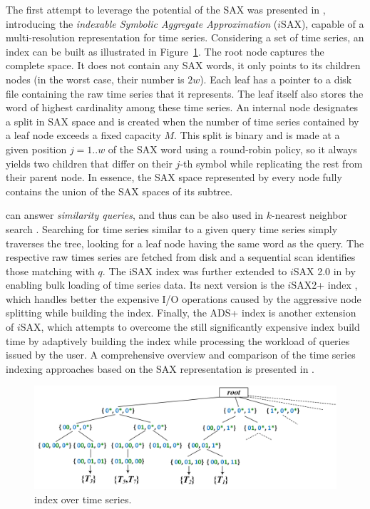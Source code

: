 The first attempt to leverage the potential of the SAX was presented in \cite{shieh2008kdd}, introducing the \textit{indexable Symbolic Aggregate Approximation} ($i$SAX), capable of a multi-resolution representation for time series. Considering a set of time series, an \isax index \cite{shieh2008kdd} can be built as illustrated in Figure~\ref{fig:isaxtree}. The root node captures the complete \isax space. It does not contain any SAX words, it only points to its children nodes (in the worst case, their number is $2w$). Each leaf has a pointer to a disk file containing the raw time series that it represents. The leaf itself also stores the \isax word of highest cardinality among these time series. An internal node designates a split in SAX space and is created when the number of time series contained by a leaf node exceeds a fixed capacity $M$. This split is binary and is made at a given position $j=1..w$ of the SAX word using a round-robin policy, so it always yields two children that differ on their $j$-th symbol while replicating the rest from their parent node. In essence, the SAX space represented by every node fully contains the union of the SAX spaces of its subtree.

\isax can answer {\em similarity queries}, and thus can be also used in $k$-nearest neighbor search \cite{shieh2008kdd}. Searching for time series similar to a given query time series simply traverses the \isax tree, looking for a leaf node having the same \isax word as the query. The respective raw times series are fetched from disk and a sequential scan identifies those matching with $q$. The iSAX index was further extended to $i$SAX 2.0 in \cite{camerra2010icdm} by enabling bulk loading of time series data. Its next version is the $i$SAX2+ index \cite{camerra2014kais}, which handles better the expensive I/O operations caused by the aggressive node splitting while building the index. Finally, the ADS+ index \cite{zoumpatianos2014sigmod} is another extension of $i$SAX, which attempts to overcome the still significantly expensive index build time by adaptively building the index while processing the workload of queries issued by the user. A comprehensive overview and comparison of the time series indexing approaches based on the SAX representation is presented in \cite{palpanas2016bigsm}.

\begin{figure}[tb]
 \centering
 \includegraphics[width=\textwidth]{figures/isax_tree2.png}
 \caption{\isax index over time series.}
 \label{fig:isaxtree}
\end{figure}

